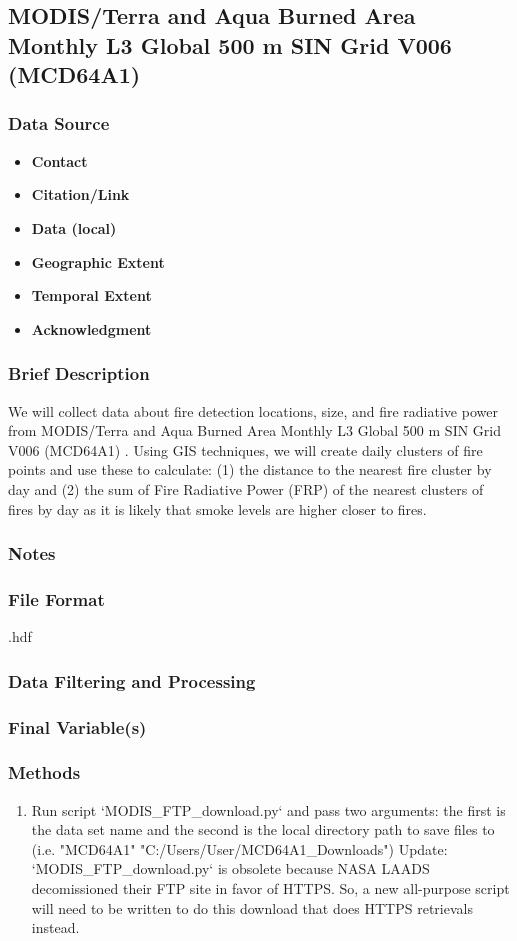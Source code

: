 \subsection{MODIS/Terra and Aqua Burned Area Monthly L3 Global 500 m SIN Grid V006 (MCD64A1) }
\subsubsection*{Data Source}
\begin{itemize}[nolistsep]
\item \textbf{Contact}
\item \textbf{Citation/Link}
\item \textbf{Data (local)}
\item \textbf{Geographic Extent}
\item \textbf{Temporal Extent}
\item \textbf{Acknowledgment}
\end{itemize}
\subsubsection*{Brief Description}

We will collect data about fire detection locations, size, and fire radiative power from MODIS/Terra and Aqua Burned Area Monthly L3 Global 500 m SIN Grid V006 (MCD64A1) 
\citep{Schroeder2014}. %
Using GIS techniques, we will create daily clusters of fire points and use these to calculate: (1) the distance to the nearest fire cluster by day and (2) the sum of Fire Radiative Power (FRP) of the nearest clusters of fires by day as it is likely that smoke levels are higher closer to fires.

\subsubsection*{Notes}
\subsubsection*{File Format} .hdf
\subsubsection*{Data Filtering and Processing}
\subsubsection*{Final Variable(s)}
\subsubsection*{Methods}
\begin{enumerate}
\item Run script `MODIS\_FTP\_download.py` and pass two arguments: the first is the data set name and the second is the local directory path to save files to (i.e. "MCD64A1" "C:/Users/User/MCD64A1\_Downloads")
Update: `MODIS\_FTP\_download.py` is obsolete because NASA LAADS decomissioned their FTP site in favor of HTTPS. So, a new all-purpose script will need to be written to do this download that does HTTPS retrievals instead.
\end{enumerate}
